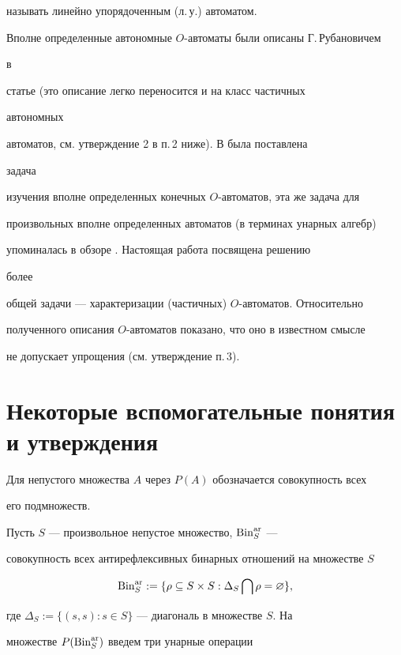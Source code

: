 называть линейно упорядоченным (л.\,у.) автоматом.





Вполне определенные автономные $O$-автоматы были описаны Г.\,Рубановичем


в


статье \cite{Rub} (это описание легко переносится и на класс частичных


автономных


автоматов, см. утверждение 2 в п.\,2 ниже). В \cite{Bog} была поставлена


задача


изучения вполне определенных конечных $O$-автоматов, эта же задача для


произвольных вполне определенных автоматов (в терминах унарных алгебр)


упоминалась в обзоре \cite{Gab}. Настоящая работа посвящена решению


более


общей задачи --- характеризации (частичных) $O$-автоматов. Относительно


полученного описания $O$-автоматов показано, что оно в известном смысле


не допускает упрощения (см. утверждение п.\,3).





\section{Некоторые вспомогательные понятия и утверждения}





Для непустого множества $A$ через $P(A)$ обозначается совокупность всех


его подмножеств.





Пусть $S$ --- произвольное непустое множество, $\operatorname{Bin}_S^{\mathrm{ar}}$ ---


совокупность всех антирефлексивных бинарных отношений на множестве $S$


$$


\Bin_S^{\ar}:=\{\rho\subseteq S\times S:\Delta_S\bigcap\rho=\varnothing\},


$$


где $\Delta_S:=\{(s,s):s\in S\}$ --- диагональ в множестве $S$. На


множестве $P(\operatorname{Bin}_S^{\mathrm{ar}})$ введем три унарные операции


